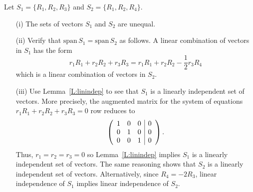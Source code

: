 \documentclass{ximera}
\begin{document}
\begin{exercise}
\begin{solution}
\begin{enumeratea}
\item Let $S_1=\{R_1,R_2,R_3\}$ and $S_2=\{R_1,R_2,R_4\}$.   
\begin{enumerate}
	\item[(i)] The sets of vectors $S_1$ and $S_2$ are unequal.
	\item[(ii)] Verify that $\mathrm{span}\,S_1 = \mathrm{span}\,S_2$ as follows.  A linear combination of vectors in $S_1$ has the form
	\[
	r_1 R_1 + r_2 R_2 + r_3 R_3 = r_1 R_1 + r_2 R_2 - \frac{1}{2} r_3 R_4 
	\]
	which is a linear combination of vectors in $S_2$. 
	\item[(iii)] Use  Lemma~\ref{L:linindep} to see that $S_1$ is a linearly independent set of vectors. More precisely, the augmented matrix for the system of equations $r_1R_1+r_2 R_2+r_3 R_3=0$ row reduces to 
\[
\left(
\begin{array}{ccc|c}
 1 & 0 & 0 & 0 \\
 0 & 1 & 0& 0 \\
 0 & 0 & 1& 0 \\
\end{array}
\right)\ldotp
\]
Thus, $r_1 = r_2 = r_3 = 0$ so Lemma~\ref{L:linindep} implies $S_1$ is a linearly independent set of vectors. The same reasoning shows that $S_2$ is a linearly independent set of vectors.  Alternatively, since $R_4=-2R_3$, linear independence of $S_1$ implies linear independence of $S_2$.
\end{enumerate}
\end{enumeratea}
\end{solution}
\end{exercise}
\end{document}
